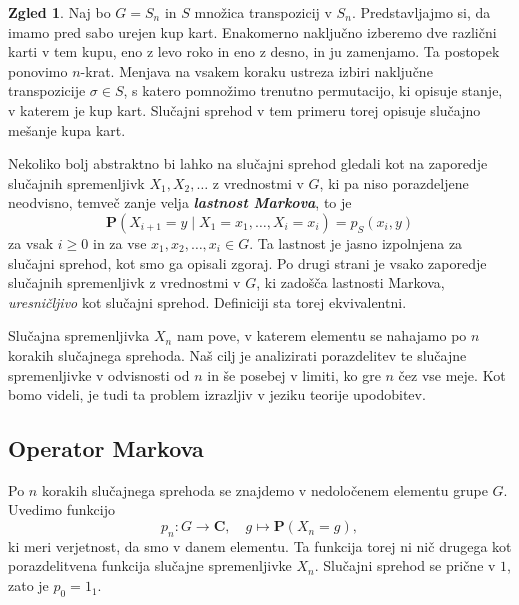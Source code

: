 \documentclass[11pt]{book}
\def\CC{\mathbf{C}}
\def\PP{\mathbf{P}}
\def\definicija{\color{rdeca}\bf\em}
\theoremstyle{definition}
\theoremstyle{zgled}
\newtheorem*{zgled}{Zgled}
\theoremstyle{odprtproblem}
\theoremstyle{domacanaloga}
\theoremstyle{izrek}
\begin{document}
\begin{zgled}
Naj bo $G = S_n$ in $S$ množica transpozicij v $S_n$. Predstavljajmo si, da imamo pred sabo urejen kup kart. Enakomerno naključno izberemo dve različni karti v tem kupu, eno z levo roko in eno z desno, in ju zamenjamo. Ta postopek ponovimo $n$-krat. Menjava na vsakem koraku ustreza izbiri naključne transpozicije $\sigma \in S$, s katero pomnožimo trenutno permutacijo, ki opisuje stanje, v katerem je kup kart. Slučajni sprehod v tem primeru torej opisuje slučajno mešanje kupa kart.
\end{zgled}

Nekoliko bolj abstraktno bi lahko na slučajni sprehod gledali kot na zaporedje slučajnih spremenljivk $X_1, X_2, \dots$ z vrednostmi v $G$, ki pa niso porazdeljene neodvisno, temveč zanje velja {\definicija lastnost Markova}, to je
\[
    \PP( X_{i+1} = y \mid X_1 = x_1, \dots, X_i = x_i)
    = p_S(x_i, y)
\]
za vsak $i \geq 0$ in za vse $x_1, x_2, \dots, x_i \in G$. Ta lastnost je jasno izpolnjena za slučajni sprehod, kot smo ga opisali zgoraj. Po drugi strani je vsako zaporedje slučajnih spremenljivk z vrednostmi v $G$, ki zadošča lastnosti Markova, \emph{uresničljivo} kot slučajni sprehod. Definiciji sta torej ekvivalentni.

Slučajna spremenljivka $X_n$ nam pove, v katerem elementu se nahajamo po $n$ korakih slučajnega sprehoda. Naš cilj je analizirati porazdelitev te slučajne spremenljivke v odvisnosti od $n$ in še posebej v limiti, ko gre $n$ čez vse meje. Kot bomo videli, je tudi ta problem izrazljiv v jeziku teorije upodobitev.

\subsection{Operator Markova}

Po $n$ korakih slučajnega sprehoda se znajdemo v nedoločenem elementu grupe $G$. Uvedimo funkcijo
\[
    p_n \colon G \to \CC, \quad
    g \mapsto \PP(X_n = g),
\]
ki meri verjetnost, da smo v danem elementu. Ta funkcija torej ni nič drugega kot porazdelitvena funkcija slučajne spremenljivke $X_n$. Slučajni sprehod se prične v $1$, zato je $p_0 = 1_1$.
\end{document}
